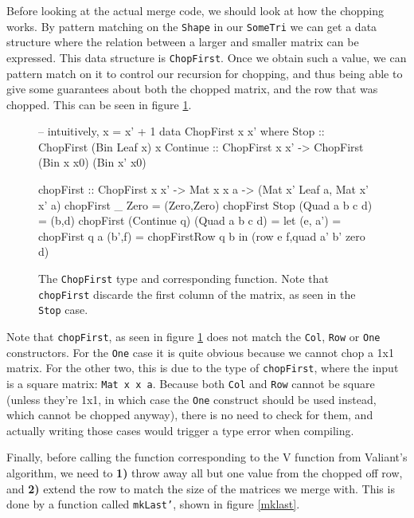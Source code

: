 \documentclass[a4paper,12pt,twosided]{report}
\begin{document}
Before looking at the actual merge code, we should look at how the chopping
works. By pattern matching on the \texttt{Shape} in our \texttt{SomeTri} we can
get a data structure where the relation between a larger and smaller matrix can
be expressed. This data structure is \texttt{ChopFirst}. Once we obtain such a
value, we can pattern match on it to control our recursion for chopping, and
thus being able to give some guarantees about both the chopped matrix, and the
row that was chopped. This can be seen in figure \ref{chopfirst}.

\begin{figure}[H]
\begin{code}
-- intuitively, x = x' + 1
data ChopFirst x x' where
  Stop :: ChopFirst (Bin Leaf x) x
  Continue :: ChopFirst x x' -> ChopFirst (Bin x x0) (Bin x' x0)

chopFirst :: ChopFirst x x' -> Mat x x a  
                            -> (Mat x' Leaf a, Mat x' x' a)
chopFirst _ Zero = (Zero,Zero)
chopFirst Stop (Quad a b c d) = (b,d)
chopFirst (Continue q) (Quad a b c d) =
  let  (e, a') = chopFirst q a
       (b',f)  = chopFirstRow q b
  in (row e f,quad a' b' zero d)
\end{code}
\caption{\label{chopfirst} The \texttt{ChopFirst} type and corresponding
function. Note that \texttt{chopFirst} discarde the first column of the matrix,
as seen in the \texttt{Stop} case.}
\end{figure}

Note that \texttt{chopFirst}, as seen in figure \ref{chopfirst} does not match
the \texttt{Col}, \texttt{Row} or \texttt{One} constructors. For the
\texttt{One} case it is quite obvious because we cannot chop a 1x1 matrix. For
the other two, this is due to the type of \texttt{chopFirst}, where the input is
a square matrix: \texttt{Mat x x a}. Because both \texttt{Col} and \texttt{Row}
cannot be square (unless they're 1x1, in which case the \texttt{One} construct
should be used instead, which cannot be chopped anyway), there is no need to
check for them, and actually writing those cases would trigger a type error when
compiling.

Finally, before calling the function corresponding to the V function from
Valiant's algorithm, we need to \textbf{1)} throw away all but one value from
the chopped off row, and \textbf{2)} extend the row to match the size of the
matrices we merge with. This is done by a function called \texttt{mkLast'},
shown in figure \ref{mklast}.
\end{document}
